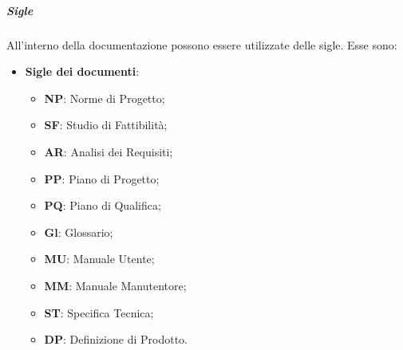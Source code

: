 \documentclass[../norme-di-progetto.tex]{subfiles}
\begin{document}
\subparagraph*{Sigle}
All'interno della documentazione possono essere utilizzate delle sigle. Esse sono:
\begin{itemize}
  \item \textbf{Sigle dei documenti}:
  \begin{itemize}
    \item \textbf{NP}: Norme di Progetto;
    \item \textbf{SF}: Studio di Fattibilità;
    \item \textbf{AR}: Analisi dei Requisiti;
    \item \textbf{PP}: Piano di Progetto;
    \item \textbf{PQ}: Piano di Qualifica;
    \item \textbf{Gl}: Glossario;
    \item \textbf{MU}: Manuale Utente;
    \item \textbf{MM}: Manuale Manutentore;
    \item \textbf{ST}: Specifica Tecnica;
    \item \textbf{DP}: Definizione di Prodotto.
  \end{itemize}


\end{itemize}
\end{document}
